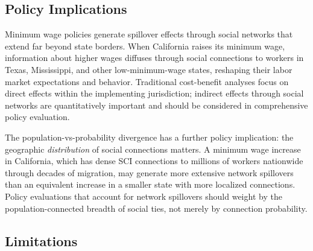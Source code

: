 \documentclass[12pt]{article}
\begin{document}
\subsection{Policy Implications}

Minimum wage policies generate spillover effects through social networks that extend far beyond state borders. When California raises its minimum wage, information about higher wages diffuses through social connections to workers in Texas, Mississippi, and other low-minimum-wage states, reshaping their labor market expectations and behavior. Traditional cost-benefit analyses focus on direct effects within the implementing jurisdiction; indirect effects through social networks are quantitatively important and should be considered in comprehensive policy evaluation.

The population-vs-probability divergence has a further policy implication: the geographic \textit{distribution} of social connections matters. A minimum wage increase in California, which has dense SCI connections to millions of workers nationwide through decades of migration, may generate more extensive network spillovers than an equivalent increase in a smaller state with more localized connections. Policy evaluations that account for network spillovers should weight by the population-connected breadth of social ties, not merely by connection probability.

\subsection{Limitations}
\end{document}
